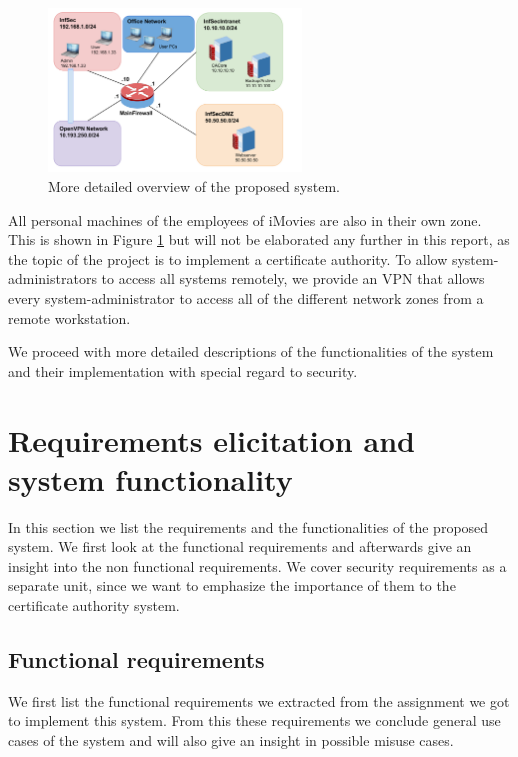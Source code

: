 \documentclass[a4paper, toc=index, 12pt, DIV14, twoside, BCOR2cm, headsepline, numbers=noenddot, bibliography=totoc]{scrbook}
\begin{document}
\begin{figure}[H]
  \centering
    \includegraphics[width=0.6\textwidth]{images/system_overview_new.pdf}  
  \caption{More detailed overview of the proposed system.}
  \label{systemoverview}
\end{figure}

All personal machines of the employees of iMovies are also in their own zone. This is shown in Figure \ref{systemoverview} but will not be elaborated any further in this report, as the topic of the project is to implement a certificate authority.\newline
To allow system-administrators to access all systems remotely, we provide an VPN that allows every system-administrator to access all of the different network zones from a remote workstation.

We proceed with more detailed descriptions of the functionalities of the system and their implementation with special regard to security.

\section{Requirements elicitation and system functionality}
In this section we list the requirements and the functionalities of the proposed system. We first look at the functional requirements and afterwards give an insight into the non functional requirements. We cover security requirements as a separate unit, since we want to emphasize the importance of them to the certificate authority system.

\subsection{Functional requirements}
We first list the functional requirements we extracted from the assignment we got to implement this system. From this these requirements we conclude general use cases of the system and will also give an insight in possible misuse cases.
\end{document}

